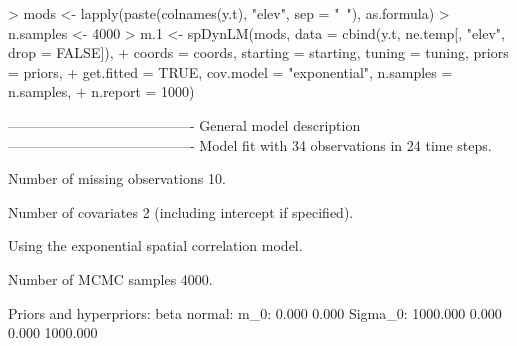 \documentclass{article}
\begin{document}
\begin{Schunk}
\begin{Sinput}
> mods <- lapply(paste(colnames(y.t), "elev", sep = "~"), as.formula)
> n.samples <- 4000
> m.1 <- spDynLM(mods, data = cbind(y.t, ne.temp[, "elev", drop = FALSE]), 
+     coords = coords, starting = starting, tuning = tuning, priors = priors, 
+     get.fitted = TRUE, cov.model = "exponential", n.samples = n.samples, 
+     n.report = 1000)
\end{Sinput}
\begin{Soutput}
----------------------------------------
	General model description
----------------------------------------
Model fit with 34 observations in 24 time steps.

Number of missing observations 10.

Number of covariates 2 (including intercept if specified).

Using the exponential spatial correlation model.

Number of MCMC samples 4000.

Priors and hyperpriors:
	beta normal:
	m_0:	0.000	0.000	
	Sigma_0:
	1000.000	0.000	
	0.000	1000.000	


\end{Soutput}
\end{Schunk}
\end{document}
